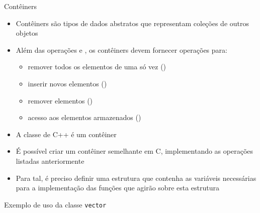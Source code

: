 \begin{frame}[fragile]{Contêiners}

	\begin{itemize}

		\item Contêiners são tipos de dados abstratos que representam coleções de outros objetos

		\item Além das operações  e , os contêiners devem fornecer 
        operações para:
		\begin{itemize}
			\item remover todos os elementos de uma só vez ()
			\item inserir novos elementos ()
			\item remover elementos ()
			\item acesso aos elementos armazenados ()
		\end{itemize}

		\item A classe  de C++ é um contêiner

		\item É possível criar um contêiner semelhante em C, implementando as operações listadas 
		anteriormente

		\item Para tal, é preciso definir uma estrutura que contenha as variáveis necessárias para 
        a implementação das funções que agirão sobre esta estrutura
	\end{itemize}

\end{frame}

\begin{frame}[fragile]{Exemplo de uso da classe \texttt{vector}}
\end{frame}
